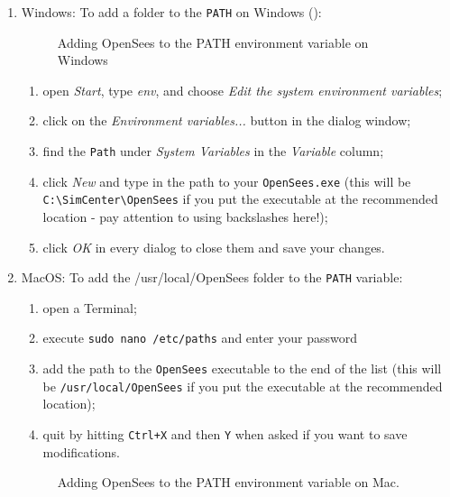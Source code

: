 \begin{enumerate}
\item Windows: To add a folder to the \texttt{PATH} on Windows ():

\begin{figure}[!htbp]
  \caption{Adding OpenSees to the PATH environment variable on Windows}
  \label{fig:add_env_path}
\end{figure}


\begin{enumerate}
    \item open \emph{Start}, type \emph{env}, and choose \emph{Edit the system environment variables};
    \item click on the \emph{Environment variables...} button in the dialog window;
    \item find the \texttt{Path} under \emph{System Variables} in the \emph{Variable} column;
    \item click \emph{New} and type in the path to your \texttt{OpenSees.exe} (this will be \texttt{C:\textbackslash SimCenter\textbackslash OpenSees} if you put the executable at the recommended location - pay attention to using backslashes here!);
    \item click \emph{OK} in every dialog to close them and save your changes.
\end{enumerate}

\item MacOS: To add the /usr/local/OpenSees folder to the \texttt{PATH} variable:


\begin{enumerate}
    \item open a Terminal;
    \item execute \texttt{sudo nano /etc/paths} and enter your password
    \item add the path to the \texttt{OpenSees} executable to the end of the list (this will be \texttt{/usr/local/OpenSees} if you put the executable at the recommended location);
    \item quit by hitting \texttt{Ctrl+X} and then \texttt{Y} when asked if you want to save modifications.
\end{enumerate}

\begin{figure}[!htbp]
  \caption{Adding OpenSees to the PATH environment variable on Mac.}
  \label{fig:add_env_path_Mac}
\end{figure}
\end{enumerate}


